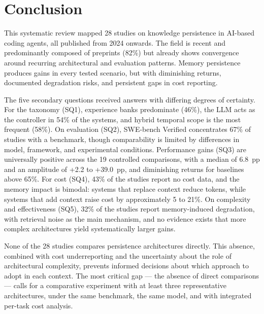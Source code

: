 \section{Conclusion}
\label{sec:conclusao}

This systematic review mapped 28 studies on knowledge persistence in
AI-based coding agents, all published from 2024 onwards.
The field is recent and predominantly composed of preprints (82\%) but
already shows convergence around recurring architectural and evaluation
patterns.
Memory persistence produces gains in every tested scenario, but with
diminishing returns, documented degradation risks, and persistent gaps
in cost reporting.

The five secondary questions received answers with differing degrees of
certainty.
For the taxonomy (SQ1), experience banks predominate (46\%), the LLM
acts as the controller in 54\% of the systems, and hybrid temporal
scope is the most frequent (58\%).
On evaluation (SQ2), SWE-bench Verified concentrates 67\% of studies
with a benchmark, though comparability is limited by differences in
model, framework, and experimental conditions.
Performance gains (SQ3) are universally positive across the 19
controlled comparisons, with a median of 6.8~pp and an amplitude of
+2.2 to +39.0~pp, and diminishing returns for baselines above 65\%.
For cost (SQ4), 43\% of the studies report no cost data, and the
memory impact is bimodal: systems that replace context reduce tokens,
while systems that add context raise cost by approximately 5 to 21\%.
On complexity and effectiveness (SQ5), 32\% of the studies report
memory-induced degradation, with retrieval noise as the main mechanism,
and no evidence exists that more complex architectures yield
systematically larger gains.

None of the 28 studies compares persistence architectures directly.
This absence, combined with cost underreporting and the uncertainty
about the role of architectural complexity, prevents informed decisions
about which approach to adopt in each context.
The most critical gap --- the absence of direct comparisons --- calls
for a comparative experiment with at least three representative
architectures, under the same benchmark, the same model, and with
integrated per-task cost analysis.
